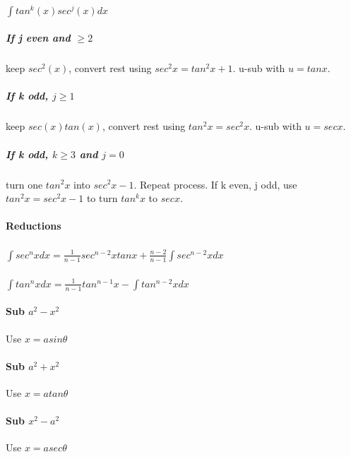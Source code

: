 \documentclass[10pt,landscape]{article}
\begin{document}
\begin{multicols}{4}
\paragraph{$ \int tan^k(x)sec^j(x)dx $}
\subparagraph{If j even and $\ge 2$}
keep $sec^2(x)$, convert rest using $sec^2x=tan^2x+1$. u-sub with $u=tanx$.
\subparagraph{If k odd, $j \ge 1$}
keep $sec(x)tan(x)$, convert rest using $tan^2x=sec^2x$. u-sub with $u=secx$.
\subparagraph{If k odd, $k \ge 3$ and $j=0$}
turn one $tan^2x$ into $sec^2x-1$. Repeat process.
If k even, j odd, use $tan^2x=sec^2x-1$ to turn $tan^kx$ to $secx$.

\paragraph{Reductions}
\subparagraph{}
$ \int sec^nx dx = \frac{1}{n-1}sec^{n-2}xtanx+\frac{n-2}{n-1}\int sec^{n-2}x dx$
\subparagraph{}
$ \int tan^nx dx = \frac{1}{n-1}tan^{n-1}x-\int tan^{n-2}x dx$

\paragraph{Sub $a^2-x^2$}
Use $x=asin\theta$
\paragraph{Sub $a^2+x^2$}
Use $x=atan\theta$
\paragraph{Sub $x^2-a^2$}
Use $x=asec\theta$
		
	\end{multicols}
\end{document}
